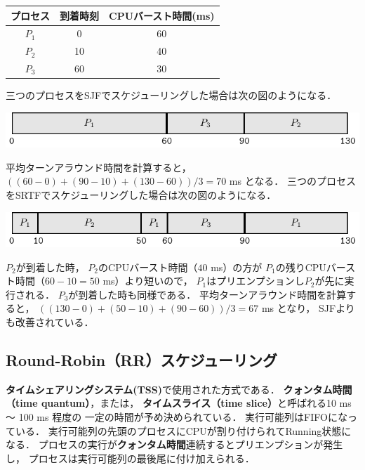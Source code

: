 \begin{center}
\begin{tabular}{c c c}
プロセス & 到着時刻 & CPUバースト時間(ms) \\
\hline
$P_1$    & 0  & 60 \\
$P_2$    & 10 & 40 \\
$P_3$    & 60 & 30 \\
\end{tabular}
\end{center}

三つのプロセスをSJFでスケジューリングした場合は次の図のようになる．

\begin{center}
\includegraphics[scale=1.0]{GanntChart/sjf2.pdf}
\end{center}

平均ターンアラウンド時間を計算すると，
$((60-0)+(90-10)+(130-60))/3=70$ ms となる．
三つのプロセスをSRTFでスケジューリングした場合は次の図のようになる．

\begin{center}
\includegraphics[scale=1.0]{GanntChart/srtf1.pdf}
\end{center}

$P_2$が到着した時，
$P_2$のCPUバースト時間（$40$ ms）の方が
$P_1$の残りCPUバースト時間（$60 - 10 = 50$ ms）より短いので，
$P_1$はプリエンプションし$P_2$が先に実行される．
$P_3$が到着した時も同様である．
平均ターンアラウンド時間を計算すると，
$((130-0)+(50-10)+(90-60))/3=67$ ms となり，
SJFよりも改善されている．

\subsection{Round-Robin（RR）スケジューリング}
{\bf タイムシェアリングシステム(TSS)}で使用された方式である．
{\bf クォンタム時間（time quantum）}，または，
{\bf タイムスライス（time slice）}と呼ばれる10 ms 〜 100 ms 程度の
一定の時間が予め決められている．
実行可能列はFIFOになっている．
実行可能列の先頭のプロセスにCPUが割り付けられてRunning状態になる．
プロセスの実行が{\bf クォンタム時間}連続するとプリエンプションが発生し，
プロセスは実行可能列の最後尾に付け加えられる．

